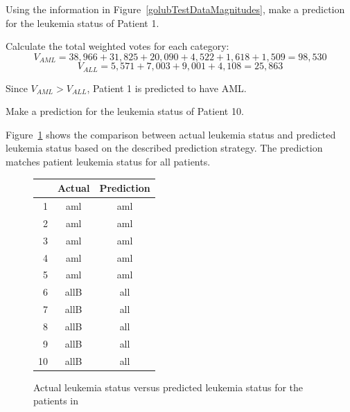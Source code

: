 \begin{examplewrap}
\begin{nexample}{Using the information in Figure~\ref{golubTestDataMagnitudes}, make a prediction for the leukemia status of Patient 1.}
	
Calculate the total weighted votes for each category:
\[V_{AML} = 38,966 + 31,825 + 20,090 + 4,522 + 1,618 + 1,509 = 98,530 \]
\[V_{ALL} = 5,571 + 7,003 + 9,001 + 4,108 = 25,863 \]	

Since $V_{AML} > V_{ALL}$, Patient 1 is predicted to have AML.
\end{nexample}
\end{examplewrap}

\begin{exercisewrap}
\begin{nexercise}
Make a prediction for the leukemia status of Patient 10.\footnotemark{}
\end{nexercise}
\end{exercisewrap}

Figure~\ref{golubActualPrediction} shows the comparison between actual leukemia status and predicted leukemia status based on the described prediction strategy. The prediction matches patient leukemia status for all patients. 

\begin{figure}[ht]
	\centering
	\begin{tabular}{r|cc}
		\hline
		& Actual & Prediction \\ 
		\hline
		1 & aml & aml \\ 
		2 & aml & aml \\ 
		3 & aml & aml \\ 
		4 & aml & aml \\ 
		5 & aml & aml \\ 
		6 & allB & all \\ 
		7 & allB & all \\ 
		8 & allB & all \\ 
		9 & allB & all \\ 
		10 & allB & all \\ 
		\hline
	\end{tabular}
	\caption{Actual leukemia status versus predicted leukemia status for the patients in  \label{golubActualPrediction}}
\end{figure}

